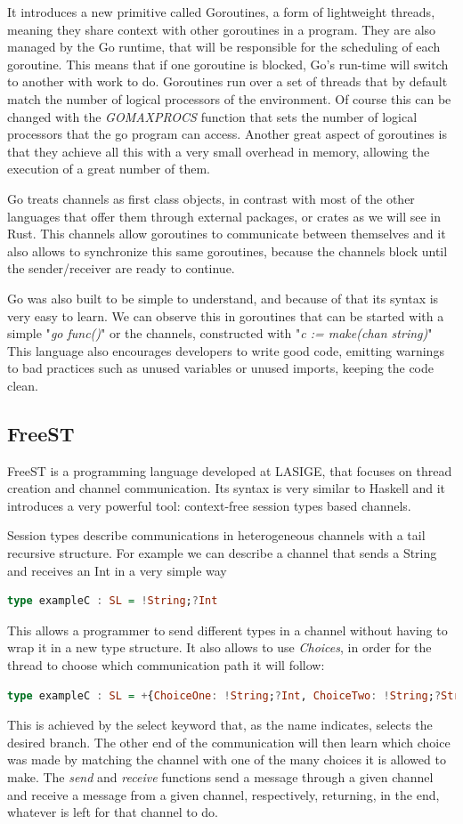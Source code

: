 \documentclass[runningheads]{llncs}
\begin{document}
It introduces a new primitive called Goroutines, a form of lightweight threads, meaning they share context with other goroutines in a program. They are also managed by the Go runtime, that will be responsible for the scheduling of each goroutine. This means that if one goroutine is blocked, Go's run-time will switch to another with work to do.
Goroutines run over a set of threads that by default match the number of logical processors of the environment. Of course this can be changed with the {\it GOMAXPROCS} function that sets the number of logical processors that the go program can access. Another great aspect of goroutines is that they achieve all this with a very small overhead in memory, allowing the execution of a great number of them.

Go treats channels as first class objects, in contrast with most of the other languages that offer them through external packages, or crates as we will see in Rust. This channels allow goroutines to communicate between themselves and it also allows to synchronize this same goroutines, because the channels block until the sender/receiver are ready to continue.

Go was also built to be simple to understand, and because of that its syntax is very easy to learn. We can observe this in goroutines that can be started with a simple "{\it go func()}" or the channels, constructed with "{\it c := make(chan string)}"
This language also encourages developers to write good code, emitting warnings to bad practices such as unused variables or unused imports, keeping the code clean.
\subsection{FreeST}
FreeST is a programming language developed at LASIGE, that focuses on thread creation and channel communication. Its syntax is very similar to Haskell and it introduces a very powerful tool: context-free session types based channels.

Session types describe communications in heterogeneous channels with a tail recursive structure\cite{session}.
For example we can describe a channel that sends a String and receives an Int in a very simple way
\begin{lstlisting}[language=haskell]
type exampleC : SL = !String;?Int
\end{lstlisting}
This allows a programmer to send different types in a channel without having to wrap it in a new type structure.
It also allows to use {\it Choices}, in order for the thread to choose which communication path it will follow:
\begin{lstlisting}[language=haskell]
type exampleC : SL = +{ChoiceOne: !String;?Int, ChoiceTwo: !String;?String}
\end{lstlisting}
This is achieved by the select keyword that, as the name indicates, selects the desired branch. The other end of the communication will then learn which choice was made by matching the channel with one of the many choices it is allowed to make.
The {\it send} and {\it receive} functions send a message through a given channel and receive a message from a given channel, respectively, returning, in the end, whatever is left for that channel to do.
\end{document}
